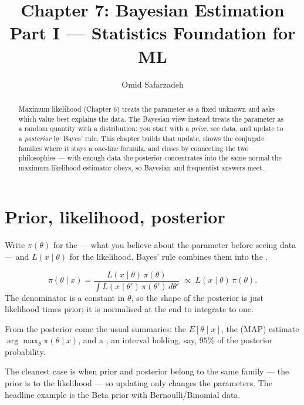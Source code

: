 \documentclass[11pt]{article}
\title{Chapter 7: Bayesian Estimation \\ \large Part I --- Statistics Foundation for ML}
\author{Omid Safarzadeh}
\date{}
\begin{document}
\maketitle

\begin{abstract}
\noindent
Maximum likelihood (Chapter 6) treats the parameter as a fixed unknown and
asks which value best explains the data. The Bayesian view instead treats
the parameter as a random quantity with a distribution: you start with a
\emph{prior}, see data, and update to a \emph{posterior} by Bayes' rule.
This chapter builds that update, shows the conjugate families where it stays
a one-line formula, and closes by connecting the two philosophies --- with
enough data the posterior concentrates into the same normal the
maximum-likelihood estimator obeys, so Bayesian and frequentist answers meet.
\end{abstract}

\tableofcontents

\section{Prior, likelihood, posterior}

Write $\pi(\theta)$ for the  --- what you believe about the
parameter before seeing data --- and $L(x \mid \theta)$ for the likelihood.
Bayes' rule combines them into the .

\begin{definition}[Posterior]
\[
  \pi(\theta \mid x) = \frac{L(x\mid\theta)\,\pi(\theta)}{\int L(x\mid\theta')\,\pi(\theta')\,d\theta'}
  \;\propto\; L(x\mid\theta)\,\pi(\theta).
\]
The denominator is a constant in $\theta$, so the shape of the posterior is
just likelihood times prior; it is normalised at the end to integrate to one.
\end{definition}

From the posterior come the usual summaries: the 
$E[\theta\mid x]$, the  (MAP) estimate
$\arg\max_\theta \pi(\theta\mid x)$, and a , an
interval holding, say, $95\%$ of the posterior probability.

The cleanest case is when prior and posterior belong to the same family ---
the prior is  to the likelihood --- so updating only
changes the parameters. The headline example is the Beta prior with
Bernoulli/Binomial data.
\end{document}
